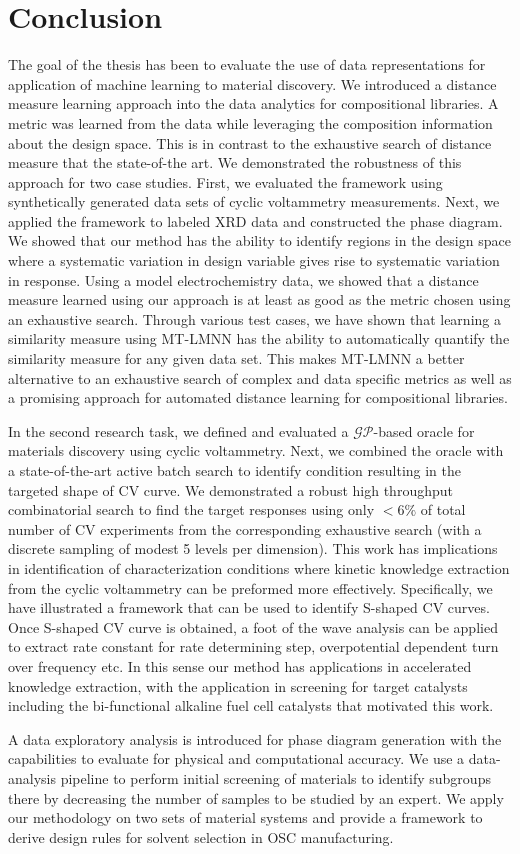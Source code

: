 \chapter{Conclusion}
The goal of the thesis has been to evaluate the use of data representations for application of machine learning to material discovery.
We introduced a distance measure learning approach into the data analytics for compositional libraries. 
A metric was learned from the data while leveraging the composition information about the design space. 
This is in contrast to the exhaustive search of distance measure that the state-of-the art.
We demonstrated the robustness of this approach for two case studies. 
First, we evaluated the framework using synthetically generated data sets of cyclic voltammetry measurements. 
Next, we applied the framework to labeled XRD data and constructed the phase diagram.
We showed that our method has the ability to identify regions in the design space where a systematic variation in design variable gives rise to systematic variation in response. 
Using a model electrochemistry data, we showed that a distance measure learned using our approach is at least as good as the metric chosen using an exhaustive search.
Through various test cases, we have shown that learning a similarity measure using MT-LMNN has the ability to automatically quantify the similarity measure for any given data set. This makes MT-LMNN a better alternative to an exhaustive search of complex and data specific metrics as well as a promising approach for automated distance learning for compositional libraries. 


In the second research task, we defined and evaluated a \(\mathcal{GP}\)-based oracle for materials discovery using cyclic voltammetry.
Next, we combined the oracle with a state-of-the-art active batch search to identify condition resulting in the targeted shape of CV curve. 
We demonstrated a robust high throughput combinatorial search to find the target responses using only \(<6\%\) of total number of CV experiments from the corresponding exhaustive search (with a discrete sampling of modest 5 levels per dimension). 
This work has implications in identification of characterization conditions where kinetic knowledge extraction from the cyclic voltammetry can be preformed more effectively. 
Specifically, we have illustrated a framework that can be used to identify S-shaped CV curves. 
Once S-shaped CV curve is obtained, a foot of the wave analysis can be applied ~\cite{FOWA} to extract rate constant for rate determining step, overpotential dependent turn over frequency etc.
In this sense our method has applications in accelerated knowledge extraction, with the application in screening for target catalysts including the bi-functional alkaline fuel cell catalysts that motivated this work.


A data exploratory analysis is introduced for phase diagram generation with the capabilities to evaluate for physical and computational accuracy. 
We use a data-analysis pipeline to perform initial screening of materials to identify subgroups there by decreasing the number of samples to be studied by an expert.
We apply our methodology on two sets of material systems and provide a framework to derive design rules for solvent selection in OSC manufacturing.